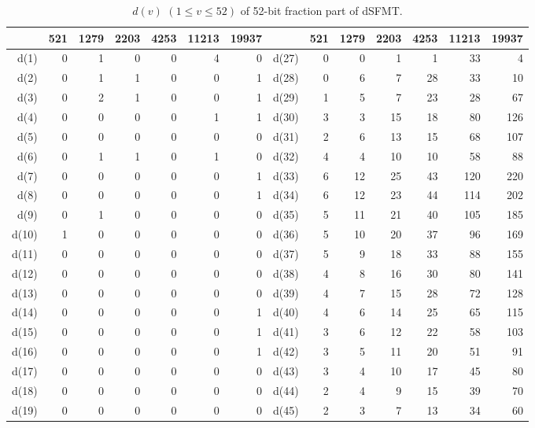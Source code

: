 \documentclass{svmult}
\begin{document}
\begin{table}
  \begin{center}
    \caption{$d(v)$ $(1 \leq v \leq 52)$ of 52-bit fraction part of dSFMT.}
    \label{tab:dd}
    \begin{tabular}{|r|rrrrrr||r|rrrrrr|} \hline
      & 521 & 1279 & 2203 & 4253 & 11213 & 19937
      & & 521 & 1279 & 2203 & 4253 & 11213 & 19937 \\ \hline
      d(1) & 0 & 1 & 0 & 0 & 4 & 0 & d(27) & 0 & 0 & 1 & 1 & 33 & 4 \\
      d(2) & 0 & 1 & 1 & 0 & 0 & 1 & d(28) & 0 & 6 & 7 & 28 & 33 & 10 \\
      d(3) & 0 & 2 & 1 & 0 & 0 & 1 & d(29) & 1 & 5 & 7 & 23 & 28 & 67 \\
      d(4) & 0 & 0 & 0 & 0 & 1 & 1 & d(30) & 3 & 3 & 15 & 18 & 80 & 126 \\
      d(5) & 0 & 0 & 0 & 0 & 0 & 0 & d(31) & 2 & 6 & 13 & 15 & 68 & 107 \\
      d(6) & 0 & 1 & 1 & 0 & 1 & 0 & d(32) & 4 & 4 & 10 & 10 & 58 & 88 \\
      d(7) & 0 & 0 & 0 & 0 & 0 & 1 & d(33) & 6 & 12 & 25 & 43 & 120 & 220 \\
      d(8) & 0 & 0 & 0 & 0 & 0 & 1 & d(34) & 6 & 12 & 23 & 44 & 114 & 202 \\
      d(9) & 0 & 1 & 0 & 0 & 0 & 0 & d(35) & 5 & 11 & 21 & 40 & 105 & 185 \\
      d(10) & 1 & 0 & 0 & 0 & 0 & 0 & d(36) & 5 & 10 & 20 & 37 & 96 & 169 \\
      d(11) & 0 & 0 & 0 & 0 & 0 & 0 & d(37) & 5 & 9 & 18 & 33 & 88 & 155 \\
      d(12) & 0 & 0 & 0 & 0 & 0 & 0 & d(38) & 4 & 8 & 16 & 30 & 80 & 141 \\
      d(13) & 0 & 0 & 0 & 0 & 0 & 0 & d(39) & 4 & 7 & 15 & 28 & 72 & 128 \\
      d(14) & 0 & 0 & 0 & 0 & 0 & 1 & d(40) & 4 & 6 & 14 & 25 & 65 & 115 \\
      d(15) & 0 & 0 & 0 & 0 & 0 & 1 & d(41) & 3 & 6 & 12 & 22 & 58 & 103 \\
      d(16) & 0 & 0 & 0 & 0 & 0 & 1 & d(42) & 3 & 5 & 11 & 20 & 51 & 91 \\
      d(17) & 0 & 0 & 0 & 0 & 0 & 0 & d(43) & 3 & 4 & 10 & 17 & 45 & 80 \\
      d(18) & 0 & 0 & 0 & 0 & 0 & 0 & d(44) & 2 & 4 & 9 & 15 & 39 & 70 \\
      d(19) & 0 & 0 & 0 & 0 & 0 & 0 & d(45) & 2 & 3 & 7 & 13 & 34 & 60 \\

\end{tabular}
\end{center}
\end{table}
\end{document}
